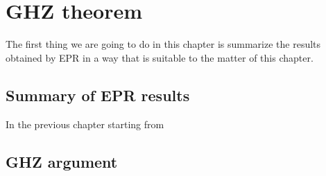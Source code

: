 \chapter{GHZ theorem}

The first thing we are going to do in this chapter is summarize the results obtained by EPR in a way that is suitable to the matter of this chapter.

\section{Summary of EPR results}
In the previous chapter starting from 



\section{GHZ argument}

